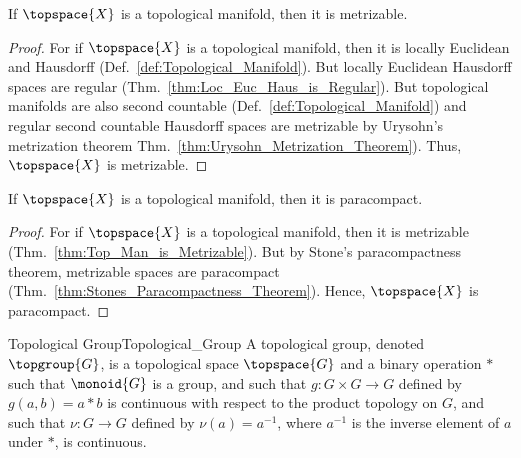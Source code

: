 \documentclass{article}                                                        %
\begin{document}
            \begin{theorem}
                \label{thm:Top_Man_is_Metrizable}%
                If $\topspace{X}$ is a topological manifold, then it is metrizable.
            \end{theorem}
            \begin{proof}
                For if $\topspace{X}$ is a topological manifold, then it is locally
                Euclidean and Hausdorff (Def.~\ref{def:Topological_Manifold}). But
                locally Euclidean Hausdorff spaces are regular
                (Thm.~\ref{thm:Loc_Euc_Haus_is_Regular}). But topological manifolds
                are also second countable (Def.~\ref{def:Topological_Manifold}) and
                regular second countable Hausdorff spaces are metrizable by
                Urysohn's metrization theorem 
                Thm.~\ref{thm:Urysohn_Metrization_Theorem}). Thus, $\topspace{X}$ is
                metrizable.
            \end{proof}
            \begin{theorem}
                \label{thm:Top_Man_is_Paracompact}%
                If $\topspace{X}$ is a topological manifold, then it is paracompact.
            \end{theorem}
            \begin{proof}
                For if $\topspace{X}$ is a topological manifold, then it is
                metrizable (Thm.~\ref{thm:Top_Man_is_Metrizable}). But by Stone's
                paracompactness theorem, metrizable spaces are paracompact
                (Thm.~\ref{thm:Stones_Paracompactness_Theorem}). Hence,
                $\topspace{X}$ is paracompact.
            \end{proof}
            \begin{fdefinition}{Topological Group}{Topological_Group}
                A topological group, denoted $\topgroup{G}$, is a topological space
                $\topspace{G}$ and a binary operation $*$ such that $\monoid{G}$ is
                a group, and such that $g:G\times{G}\rightarrow{G}$ defined by
                $g(a,b)=a*b$ is continuous with respect to the product topology on
                $G$, and such that $\nu:G\rightarrow{G}$ defined by
                $\nu(a)=a^{\minus{1}}$, where $a^{\minus{1}}$ is the inverse element
                of $a$ under $*$, is continuous.
            \end{fdefinition}
\end{document}
